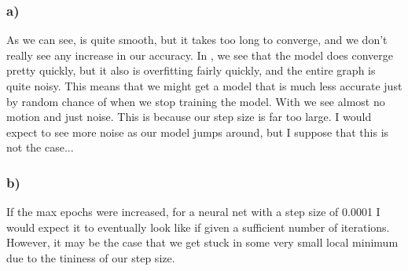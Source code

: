 \documentclass{article}
\theoremstyle{definition}
\begin{document}
        \subsubsection*{a)}
            As we can see,  is quite smooth, but it takes too long to converge, 
            and we don't really see any increase in our accuracy. In , we see that 
            the model does converge pretty quickly, but it also is overfitting fairly quickly, 
            and the entire graph is quite noisy. This means that we might get a model that is 
            much less accurate just by random chance of when we stop training the model.
            With  we see almost no motion and just noise. This is because our 
            step size is far too large. I would expect to see more noise as our model jumps around,
            but I suppose that this is not the case...
        \subsubsection*{b)}
            If the max epochs were increased, for a neural net with a step size of 0.0001 
            I would expect it to eventually look like  if given a sufficient number 
            of iterations. However, it may be the case that we get stuck in some very small local 
            minimum due to the tininess of our step size.
\end{document}

